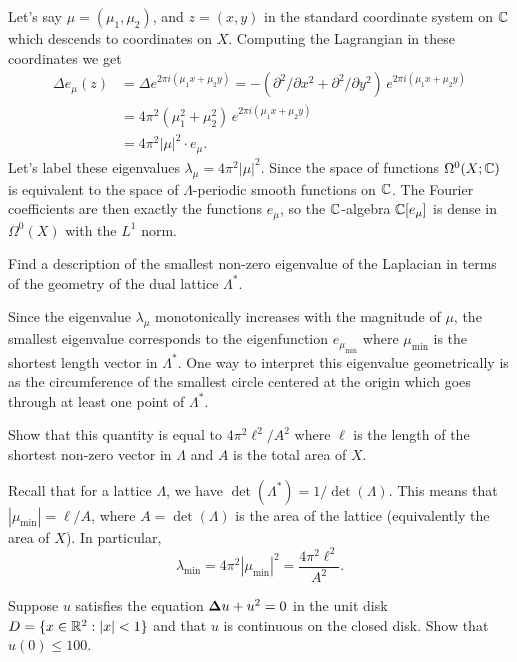 \documentclass[expanded]{lkx_pset}
\begin{document}
\begin{solution}
	Let's say $\mu = (\mu_1, \mu_2)$, and $z=(x,y)$ in the standard coordinate system on $\mathbb{C}$ which descends to coordinates on $X$. Computing the Lagrangian in these coordinates we get
	\[
		\begin{aligned}
			\Delta e_\mu(z)
			 & = \Delta e^{2\pi i(\mu_1 x + \mu_2 y)}
			= -(\partial^2/\partial x^2 + \partial^2/\partial y^2)\, e^{2\pi i(\mu_1 x + \mu_2 y)} \\
			 & = 4\pi^2(\mu_1^2+\mu_2^2)\, e^{2\pi i(\mu_1 x + \mu_2 y)}                           \\
			 & = 4\pi^2|\mu|^2 \cdot e_\mu.
		\end{aligned}
	\]
	Let's label these eigenvalues $\lambda_\mu = 4\pi^2|\mu|^2$. Since the space of functions $\Omega^0(X; \mathbb{C})$ is equivalent to the space of $\Lambda$-periodic smooth functions on $\mathbb{C}$. The Fourier coefficients are then exactly the functions $e_\mu$, so the $\mathbb{C}$-algebra $\mathbb{C}[e_\mu]$ is dense in $\Omega^0(X)$ with the $L^1$ norm.

	\begin{part}{}
		Find a description of the smallest non-zero eigenvalue of the Laplacian in terms of the geometry of the dual lattice $\Lambda^*$.
	\end{part}

	Since the eigenvalue $\lambda_\mu$ monotonically increases with the magnitude of $\mu$, the smallest eigenvalue corresponds to the eigenfunction $e_{\mu_\textrm{min}}$ where $\mu_{\textrm{min}}$ is the shortest length vector in $\Lambda^*$. One way to interpret this eigenvalue geometrically is as the circumference of the smallest circle centered at the origin which goes through at least one point of $\Lambda^*$.

	\begin{part}{}
		Show that this quantity is equal to $4\pi^2\ell^2/A^2$ where $\ell$ is the length of the shortest non-zero vector in $\Lambda$ and $A$ is the total area of $X$.
	\end{part}

	Recall that for a lattice $\Lambda$, we have $\det(\Lambda^*) = 1/\det(\Lambda)$. This means that $|\mu_{\textrm{min}}|=\ell/A$, where $A=\det(\Lambda)$ is the area of the lattice (equivalently the area of $X$). In particular,
	\[
		\lambda_{\textrm{min}} = 4\pi^2 |\mu_{\textrm{min}}|^2 = \frac{4\pi^2\ell^2}{A^2}.
	\]
\end{solution}

\begin{problem}{2}
Suppose $u$ satisfies the equation $\bm{\Delta} u + u^2 = 0$ in the unit disk $D = \{x\in \mathbb{R}^2 : |x|<1\}$ and that $u$ is continuous on the closed disk. Show that $u(0)\leq 100$.

\end{problem}
\end{document}
